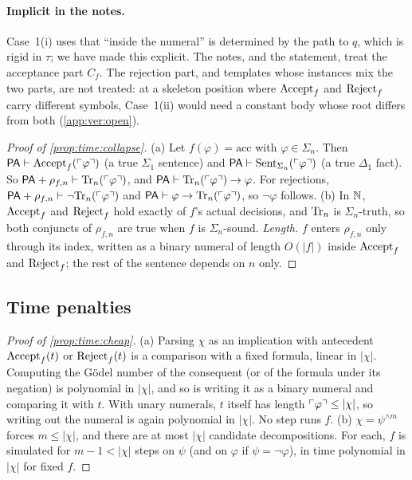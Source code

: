 \paragraph{Implicit in the notes.} Case~1(i) uses that ``inside the numeral'' is determined by the path to $q$, which is rigid in $\tau$; we have made this explicit. The notes, and the statement, treat the acceptance part $C_f$. The rejection part, and templates whose instances mix the two parts, are not treated: at a skeleton position where $\mathrm{Accept}_{f}$ and $\mathrm{Reject}_{f}$ carry different symbols, Case~1(ii) would need a constant body whose root differs from both (\cref{app:ver:open}).

\begin{proof}[Proof of \cref{prop:time:collapse}]
(a) Let $f(\varphi)=\mathrm{acc}$ with $\varphi\in\Sigma_n$. Then $\mathsf{PA}\vdash\mathrm{Accept}_{f}(\ulcorner \varphi\urcorner)$ (a true $\Sigma_1$ sentence) and $\mathsf{PA}\vdash\mathrm{Sent}_{\Sigma_n}(\ulcorner \varphi\urcorner)$ (a true $\Delta_1$ fact). So $\mathsf{PA}+\rho_{f,n}\vdash\mathrm{Tr}_n(\ulcorner \varphi\urcorner)$, and $\mathsf{PA}\vdash\mathrm{Tr}_n(\ulcorner \varphi\urcorner)\to\varphi$. For rejections, $\mathsf{PA}+\rho_{f,n}\vdash\neg\mathrm{Tr}_n(\ulcorner \varphi\urcorner)$ and $\mathsf{PA}\vdash\varphi\to\mathrm{Tr}_n(\ulcorner \varphi\urcorner)$, so $\neg\varphi$ follows.
(b) In $\mathbb{N}$, $\mathrm{Accept}_{f}$ and $\mathrm{Reject}_{f}$ hold exactly of $f$'s actual decisions, and $\mathrm{Tr}_n$ is $\Sigma_n$-truth, so both conjuncts of $\rho_{f,n}$ are true when $f$ is $\Sigma_n$-sound.
\emph{Length.} $f$ enters $\rho_{f,n}$ only through its index, written as a binary numeral of length $O(|f|)$ inside $\mathrm{Accept}_{f}$ and $\mathrm{Reject}_{f}$; the rest of the sentence depends on $n$ only.
\end{proof}

\subsection{Time penalties}\label{app:time:penalties}

\begin{proof}[Proof of \cref{prop:time:cheap}]
(a) Parsing $\chi$ as an implication with antecedent $\mathrm{Accept}_{f}(t)$ or $\mathrm{Reject}_{f}(t)$ is a comparison with a fixed formula, linear in $|\chi|$. Computing the Gödel number of the consequent (or of the formula under its negation) is polynomial in $|\chi|$, and so is writing it as a binary numeral and comparing it with $t$. With unary numerals, $t$ itself has length $\ulcorner \varphi\urcorner\le|\chi|$, so writing out the numeral is again polynomial in $|\chi|$. No step runs $f$.
(b) $\chi=\psi^{\wedge m}$ forces $m\le|\chi|$, and there are at most $|\chi|$ candidate decompositions. For each, $f$ is simulated for $m-1<|\chi|$ steps on $\psi$ (and on $\varphi$ if $\psi=\neg\varphi$), in time polynomial in $|\chi|$ for fixed $f$.
\end{proof}

